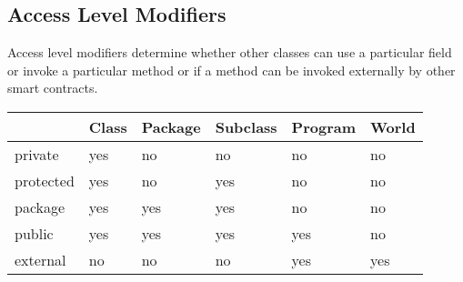 \subsection{Access Level Modifiers}\label{subsec:access-level-modifiers}

Access level modifiers determine whether other classes can use a particular field or invoke a particular method or
if a method can be invoked externally by other smart contracts.

\begin{center}
    \begin{tabular}{llllll}
        \hline
        & Class & Package & Subclass & Program & World \\
        \hline
        private   & yes   & no      & no       & no      & no    \\
        protected & yes   & no      & yes      & no      & no    \\
        package   & yes   & yes     & yes      & no      & no    \\
        public    & yes   & yes     & yes      & yes     & no    \\
        external  & no    & no      & no       & yes     & yes   \\
        \hline
    \end{tabular}\label{tab:table}
\end{center}



